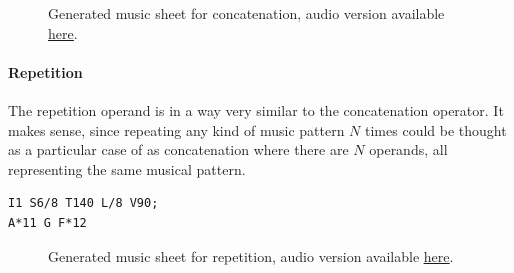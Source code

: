 \documentclass[a4paper,UKenglish,cleveref, autoref]{oasics-v2019}
\begin{document}
\begin{figure}[ht]
  \centering
  {%
  \setlength{\fboxsep}{0pt}%
  \setlength{\fboxrule}{0pt}%
  }%
  \caption{Generated music sheet for concatenation\protect\footnotemark, audio version available \href{https://drive.google.com/open?id=1TP4lcul81s8iMCUFmD3HKnSpeftCzKT0}{\underline{here}}\protect\footnotemark.}
  \label{fig:concatenation}
\end{figure}



\paragraph*{Repetition}
The repetition operand is in a way very similar to the concatenation operator. It makes sense, since repeating any kind of music pattern $N$ times could be thought as a particular case of as concatenation where there are $N$ operands, all representing the same musical pattern.

\begin{lstlisting}[caption={Intro to Westworld's Theme by Ramin Djawadi},label=list:5,captionpos=t,abovecaptionskip=-\medskipamount]
I1 S6/8 T140 L/8 V90;
A*11 G F*12
\end{lstlisting}

\begin{figure}[ht]
  \centering
  {%
  \setlength{\fboxsep}{0pt}%
  \setlength{\fboxrule}{0pt}%
  }%
  \caption{Generated music sheet for repetition, audio version available \href{https://drive.google.com/open?id=1IIm8PQkLsNFMK9MNSVubJSG6SP6KwhPL}{\underline{here}}\protect\footnotemark.}
  \label{fig:repetition}
\end{figure}
\end{document}
